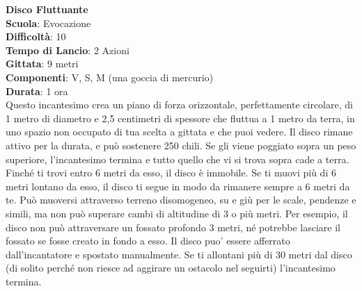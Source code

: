 \begin{multicols}{2}
\medskip\textbf{Disco Fluttuante}\\
\textbf{Scuola}: Evocazione\\
\textbf{Difficoltà}: 10\\
\textbf{Tempo di Lancio}: 2 Azioni\\
\textbf{Gittata}: 9 metri\\
\textbf{Componenti}: V, S, M (una goccia di mercurio)\\
\textbf{Durata}: 1 ora\\
Questo incantesimo crea un piano di forza orizzontale, perfettamente circolare, di 1 metro di diametro e 2,5 centimetri di spessore che fluttua a 1 metro da terra, in uno spazio non occupato di tua scelta a gittata e che puoi vedere. Il disco rimane attivo per la durata, e può sostenere 250 chili. Se gli viene poggiato sopra un peso superiore, l'incantesimo termina e tutto quello che vi si trova sopra cade a terra. Finché ti trovi entro 6 metri da esso, il disco è immobile. Se ti muovi più di 6 metri lontano da esso, il disco ti segue in modo da rimanere sempre a 6 metri da te. Può muoversi attraverso terreno disomogeneo, su e giù per le scale, pendenze e simili, ma non può superare cambi di altitudine di 3 o più metri. Per esempio, il disco non può attraversare un fossato profondo 3 metri, né potrebbe lasciare il fossato se fosse creato in fondo a esso. Il disco puo' essere afferrato dall'incantatore e spostato manualmente. Se ti allontani più di 30 metri dal disco (di solito perché non riesce ad aggirare un ostacolo nel seguirti) l'incantesimo termina.


\end{multicols}
